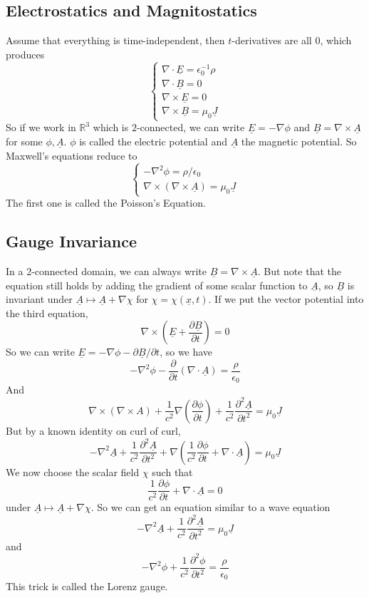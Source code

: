 \subsection{Electrostatics and Magnitostatics}
Assume that everything is time-independent, then $t$-derivatives are all $0$, which produces
$$\begin{cases}
    \nabla\cdot\underline{E}=\epsilon_0^{-1}\rho\\
    \nabla\cdot\underline{B}=0\\
    \nabla\times\underline{E}=0\\
    \nabla\times\underline{B}=\mu_0\underline{J}
\end{cases}$$
So if we work in $\mathbb R^3$ which is $2$-connected, we can write $\underline{E}=-\nabla\phi$ and $\underline{B}=\nabla\times\underline{A}$ for some $\phi,\underline{A}$.
$\phi$ is called the electric potential and $\underline{A}$ the magnetic potential.
So Maxwell's equations reduce to
$$\begin{cases}
    -\nabla^2\phi=\rho/\epsilon_0\\
    \nabla\times(\nabla\times\underline{A})=\mu_0\underline{J}
\end{cases}$$
The first one is called the Poisson's Equation.
\subsection{Gauge Invariance}
In a $2$-connected domain, we can always write $\underline{B}=\nabla\times\underline{A}$.
But note that the equation still holds by adding the gradient of some scalar function to $\underline{A}$, so $\underline{B}$ is invariant under $\underline{A}\mapsto\underline{A}+\nabla\chi$ for $\chi=\chi(\underline{x},t)$.
If we put the vector potential into the third equation,
$$\nabla\times\left( \underline{E}+\frac{\partial\underline{B}}{\partial t} \right)=0$$
So we can write $\underline{E}=-\nabla\phi-\partial\underline{B}/\partial t$, so we have
$$-\nabla^2\phi-\frac{\partial}{\partial t}(\nabla\cdot\underline{A})=\frac{\rho}{\epsilon_0}$$
And
$$\nabla\times(\nabla\times A)+\frac{1}{c^2}\nabla\left( \frac{\partial\phi}{\partial t} \right)+\frac{1}{c^2}\frac{\partial^2\underline{A}}{\partial t^2}=\mu_0\underline{J}$$
But by a known identity on curl of curl,
$$-\nabla^2\underline{A}+\frac{1}{c^2}\frac{\partial^2\underline{A}}{\partial t^2}+\nabla\left( \frac{1}{c^2}\frac{\partial\phi}{\partial t}+\nabla\cdot\underline{A} \right)=\mu_0\underline{J}$$
We now choose the scalar field $\chi$ such that
$$\frac{1}{c^2}\frac{\partial\phi}{\partial t}+\nabla\cdot\underline{A}=0$$
under $\underline{A}\mapsto\underline{A}+\nabla\chi$.
So we can get an equation similar to a wave equation
$$-\nabla^2\underline{A}+\frac{1}{c^2}\frac{\partial^2\underline{A}}{\partial t^2}=\mu_0\underline{J}$$
and
$$-\nabla^2\phi+\frac{1}{c^2}\frac{\partial^2\phi}{\partial t^2}=\frac{\rho}{\epsilon_0}$$
This trick is called the Lorenz gauge.